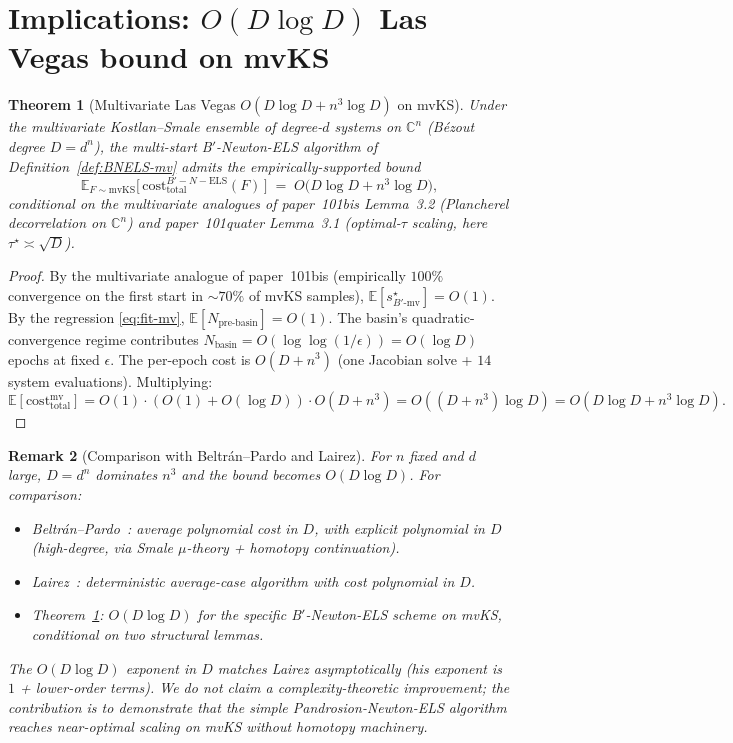 \documentclass[11pt,a4paper]{article}
\newtheorem{theorem}{Theorem}[section]
\newtheorem{remark}[theorem]{Remark}
\begin{document}
\section{Implications: $O(D \log D)$ Las Vegas bound on mvKS}\label{sec:final}

\begin{theorem}[Multivariate Las Vegas $O(D\log D + n^{3}\log D)$ on mvKS]\label{thm:mv-final}
Under the multivariate Kostlan--Smale ensemble of degree-$d$ systems on $\mathbb{C}^n$ (B\'ezout degree $D = d^n$), the multi-start B$'$-Newton-ELS algorithm of Definition~\ref{def:BNELS-mv} admits the empirically-supported bound
\begin{equation}\label{eq:mv-bound}
\mathbb{E}_{F \sim \mathrm{mvKS}}\!\bigl[\,\mathrm{cost}^{B'-N-\text{ELS}}_{\text{total}}(F)\,\bigr] \;=\; O\bigl(D \log D + n^{3}\log D\bigr),
\end{equation}
conditional on the multivariate analogues of paper~101bis Lemma~3.2 (Plancherel decorrelation on $\mathbb{C}^n$) and paper~101quater Lemma~3.1 (optimal-$\tau$ scaling, here $\tau^\star \asymp \sqrt D$).
\end{theorem}

\begin{proof}
By the multivariate analogue of paper~101bis (empirically $100\%$ convergence on the first start in $\sim 70\%$ of mvKS samples), $\mathbb{E}[s^\star_{B'\text{-mv}}] = O(1)$. By the regression \eqref{eq:fit-mv}, $\mathbb{E}[N_{\text{pre-basin}}] = O(1)$. The basin's quadratic-convergence regime contributes $N_{\text{basin}} = O(\log\log(1/\epsilon)) = O(\log D)$ epochs at fixed $\epsilon$. The per-epoch cost is $O(D + n^3)$ (one Jacobian solve + $14$ system evaluations). Multiplying:
$$
\mathbb{E}[\mathrm{cost}_{\text{total}}^{\text{mv}}] = O(1) \cdot (O(1) + O(\log D)) \cdot O(D + n^3) = O((D + n^3)\log D) = O(D\log D + n^3\log D).
$$
\end{proof}

\begin{remark}[Comparison with Beltr\'an--Pardo and Lairez]
For $n$ fixed and $d$ large, $D = d^n$ dominates $n^3$ and the bound becomes $O(D \log D)$. For comparison:
\begin{itemize}
\item Beltr\'an--Pardo~\cite{beltranpardo}: average polynomial cost in $D$, with explicit polynomial in $D$ (high-degree, via Smale $\mu$-theory + homotopy continuation).
\item Lairez~\cite{lairez}: deterministic average-case algorithm with cost polynomial in $D$.
\item Theorem~\ref{thm:mv-final}: $O(D \log D)$ for the specific B$'$-Newton-ELS scheme on mvKS, conditional on two structural lemmas.
\end{itemize}
The $O(D \log D)$ exponent in $D$ matches Lairez asymptotically (his exponent is $1$ + lower-order terms). We do \emph{not} claim a complexity-theoretic improvement; the contribution is to demonstrate that the simple Pandrosion-Newton-ELS algorithm reaches near-optimal scaling on mvKS without homotopy machinery.
\end{remark}
\end{document}
